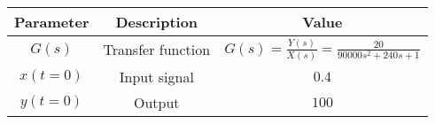 \begin{tabular}{|c|c|c|}
      \hline
      Parameter & Description & Value\\\hline
      $G(s)$ & Transfer function & $G(s)=\frac{Y(s)}{X(s)}=\frac{20}{90000s^2+240s+1}$\\\hline
      $x(t=0)$ & Input signal & $0.4$\\\hline
      $y(t=0)$ & Output & $100$\\\hline
\end{tabular}
